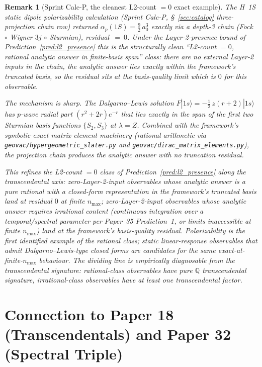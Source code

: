 \documentclass[11pt]{article}
\newtheorem{remark}{Remark}
\begin{document}
\begin{remark}[Sprint Calc-P, the cleanest L2-count $= 0$ exact
example]
\label{rem:depth_refinement}
The H~1S static dipole polarizability calculation (Sprint Calc-P,
\S~\ref{sec:catalog} three-projection chain row) returned
$\alpha_p(1S) = \tfrac{9}{2}\,a_0^3$ \emph{exactly} via a depth-3
chain (Fock $\circ$ Wigner $3j$ $\circ$ Sturmian), residual~$=~0$.
Under the Layer-2-presence bound of
Prediction~\ref{pred:l2_presence} this is the structurally clean
``L2-count $= 0$, rational analytic answer in finite-basis span''
class: there are no external Layer-2 inputs in the chain, the
analytic answer lies exactly within the framework's truncated
basis, so the residual sits at the basis-quality limit which is
$0$ for this observable.

The mechanism is sharp.  The Dalgarno--Lewis solution
$F|1s\rangle = -\tfrac{1}{2}\, z(r{+}2)|1s\rangle$ has $p$-wave
radial part $(r^2 + 2r) e^{-r}$ that lies \emph{exactly} in the
span of the first two Sturmian basis functions $\{S_2, S_3\}$ at
$\lambda = Z$.  Combined with the framework's symbolic-exact
matrix-element machinery (rational arithmetic via
\texttt{geovac/hypergeometric\_slater.py} and
\texttt{geovac/dirac\_matrix\_elements.py}), the projection chain
produces the analytic answer with no truncation residual.

This refines the L2-count $= 0$ class of
Prediction~\ref{pred:l2_presence} along the transcendental axis:
zero-Layer-2-input observables whose analytic answer is a pure
rational with a closed-form representation in the framework's
truncated basis land at residual $0$ at finite $n_\text{max}$;
zero-Layer-2-input observables whose analytic answer requires
irrational content (continuous integration over a
temporal/spectral parameter per Paper~35 Prediction~1, or limits
inaccessible at finite $n_\text{max}$) land at the framework's
basis-quality residual.  Polarizability is the first identified
example of the rational class; static linear-response observables
that admit Dalgarno--Lewis-type closed forms are candidates for
the same exact-at-finite-$n_\text{max}$ behaviour.  The dividing
line is empirically diagnosable from the transcendental
signature: rational-class observables have pure $\mathbb{Q}$
transcendental signature, irrational-class observables have at
least one transcendental factor.
\end{remark}

\section{Connection to Paper 18 (Transcendentals) and Paper 32 (Spectral Triple)}
\label{sec:connections}
\end{document}
